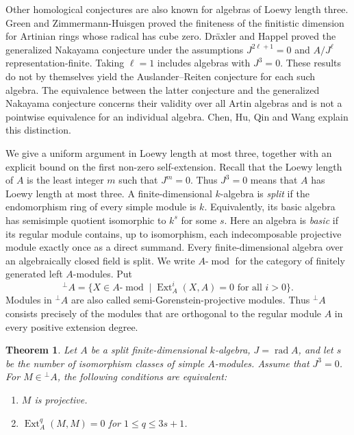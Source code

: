 \documentclass[a4paper,reqno]{amsart}
\numberwithin{equation}{section}
\newtheorem{theorem}{Theorem}[section]
\newcommand{\Ext}{\operatorname{Ext}}
\newcommand{\rad}{\operatorname{rad}}
\newcommand{\modu}{\operatorname{mod}}
\newcommand{\perpA}{{}^{\perp}\!A}
\begin{document}
Other homological conjectures are also known for algebras of Loewy
length three. Green and Zimmermann-Huisgen \cite{GreenZH91} proved the
finiteness of the finitistic dimension for Artinian rings whose radical
has cube zero. Dr\"axler and Happel \cite{DH92} proved the generalized
Nakayama conjecture under the assumptions $J^{2\ell+1}=0$ and
$A/J^\ell$ representation-finite. Taking $\ell=1$ includes algebras with
$J^3=0$. These results do not by themselves yield the Auslander--Reiten
conjecture for each such algebra. The equivalence between the latter
conjecture and the generalized Nakayama conjecture concerns their
validity over all Artin algebras and is not a pointwise equivalence for
an individual algebra. Chen, Hu, Qin and Wang
\cite[Introduction]{CHQW23} explain this distinction.

We give a uniform argument in Loewy length at most three, together
with an explicit bound on the first non-zero self-extension. Recall
that the Loewy length of $A$ is the least integer $m$ such that $J^m=0$.
Thus $J^3=0$ means that $A$ has Loewy length at most three. A
finite-dimensional $k$-algebra is \emph{split} if the endomorphism ring
of every simple module is $k$. Equivalently, its basic algebra has
semisimple quotient isomorphic to $k^s$ for some $s$. Here an algebra is
\emph{basic} if its regular module contains, up to isomorphism, each
indecomposable projective module exactly once as a direct summand.
Every finite-dimensional algebra over an algebraically closed field is
split. We write $A\text{-}\modu$ for the category of finitely generated
left $A$-modules. Put
\[
 \perpA=\{X\in A\text{-}\modu\mid
       \Ext_A^i(X,A)=0\text{ for all }i>0\}.
\]
Modules in $\perpA$ are also called semi-Gorenstein-projective modules.
Thus $\perpA$ consists precisely of the modules that are orthogonal to
the regular module $A$ in every positive extension degree.

\begin{theorem}\label{thm:main}
Let $A$ be a split finite-dimensional $k$-algebra, $J=\rad A$,
and let $s$ be the number of isomorphism classes of simple
$A$-modules. Assume that $J^3=0$. For $M\in\perpA$, the following
conditions are equivalent:
\begin{enumerate}[label=\textnormal{(\roman*)},leftmargin=2.2em]
 \item $M$ is projective.
 \vspace{2mm}
 \item $\Ext_A^q(M,M)=0$ for $1\le q\le 3s+1$.
\end{enumerate}
\end{theorem}
\end{document}
